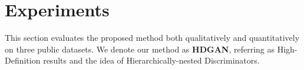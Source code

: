 \documentclass[10pt,twocolumn,letterpaper]{article}
\begin{document}
%			

\section{Experiments}
This section evaluates the proposed method both qualitatively and quantitatively on three public datasets. We denote our method as \textbf{HDGAN}, referring as High-Definition results and the idea of Hierarchically-nested Discriminators.
\end{document}
